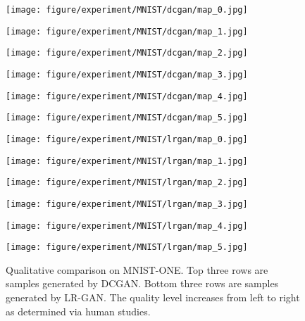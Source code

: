 \documentclass{article} \usepackage{iclr2017_conference,times}
\begin{document}
\begin{figure}[h]
\begin{minipage}{0.16\linewidth}
\center
\texttt{[image: figure/experiment/MNIST/dcgan/map\_0.jpg]}
\end{minipage}
\begin{minipage}{0.16\linewidth}
\center
\texttt{[image: figure/experiment/MNIST/dcgan/map\_1.jpg]}
\end{minipage}
\begin{minipage}{0.16\linewidth}
\center
\texttt{[image: figure/experiment/MNIST/dcgan/map\_2.jpg]}
\end{minipage}
\begin{minipage}{0.16\linewidth}
\center
\texttt{[image: figure/experiment/MNIST/dcgan/map\_3.jpg]}
\end{minipage}
\begin{minipage}{0.16\linewidth}
\center
\texttt{[image: figure/experiment/MNIST/dcgan/map\_4.jpg]}
\end{minipage}
\begin{minipage}{0.16\linewidth}
\center
\texttt{[image: figure/experiment/MNIST/dcgan/map\_5.jpg]}
\end{minipage}

\begin{minipage}{0.16\linewidth}
\center
\texttt{[image: figure/experiment/MNIST/lrgan/map\_0.jpg]}
\end{minipage}
\begin{minipage}{0.16\linewidth}
\center
\texttt{[image: figure/experiment/MNIST/lrgan/map\_1.jpg]}
\end{minipage}
\begin{minipage}{0.16\linewidth}
\center
\texttt{[image: figure/experiment/MNIST/lrgan/map\_2.jpg]}
\end{minipage}
\begin{minipage}{0.16\linewidth}
\center
\texttt{[image: figure/experiment/MNIST/lrgan/map\_3.jpg]}
\end{minipage}
\begin{minipage}{0.16\linewidth}
\center
\texttt{[image: figure/experiment/MNIST/lrgan/map\_4.jpg]}
\end{minipage}
\begin{minipage}{0.16\linewidth}
\center
\texttt{[image: figure/experiment/MNIST/lrgan/map\_5.jpg]}
\end{minipage}
\caption{Qualitative comparison on MNIST-ONE. Top three rows are samples generated by DCGAN. Bottom three rows are samples generated by LR-GAN. The quality level increases from left to right as determined via human studies.}
\label{Fig_MNISTComparison}
\end{figure}
\end{document}
